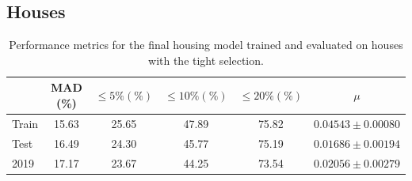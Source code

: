 \FloatBarrier
\subsection*{Houses}
\begin{table}
  \centerfloat
  \begin{tabular}{@{}lccccc@{}}
    {} &      MAD (\%) & $\leq 5\% (\%)$ &  $\leq 10\% (\%)$ &   $\leq 20\% (\%)$ & $\mu$              \\
    \midrule
    Train & \num{15.63} & \num{25.65} & \num{47.89} & \num{75.82} &  $0.04543 \pm 0.00080$ \\
    Test  & \num{16.49} & \num{24.30} & \num{45.77} & \num{75.19} &  $0.01686 \pm 0.00194$ \\
    2019  & \num{17.17} & \num{23.67} & \num{44.25} & \num{73.54} &  $0.02056 \pm 0.00279$ 
    \end{tabular}
  \vspace{\abovecaptionskip}
  \caption[Performance Metrics for Houses with the Tight Selection]{Performance metrics for the final housing model trained and evaluated on houses with the tight selection.}
  \label{tab:h:results_villa_tight}
\end{table}


